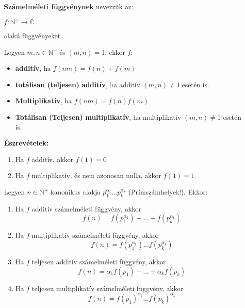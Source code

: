 \begin{frame}
  \begin{tcolorbox}[title={Def.: A számelméleti függvények}]
    \textbf{Számelméleti függvénynek} nevezzük az:\\
    \mtinyskip
    
    $f : \mathbb{N}^+ \rightarrow \mathbb{C}$\\
    \mtinyskip
    
    alakú függvényeket.\\
    \mmedskip

    Legyen $m, n \in \mathbb{N}^+$ és $(m, n) = 1$, ekkor $f$:
    \begin{itemize}
      \item \textbf{additív}, ha $f(nm) = f(n) + f(m)$
      \item \textbf{totálisan (teljesen) additív}, ha additív $(m, n) \neq 1$ esetén is.
      \item \textbf{Multiplikatív}, ha $f(nm) = f(n)f(m)$
      \item \textbf{Totálisan (Teljesen) multiplikatív}, ha multiplikatív $(m, n) \neq 1$ esetén is.
    \end{itemize}
  \tcblower
    \textbf{Észrevételek:}\\
    \begin{enumerate}
      \item Ha $f$ additív, akkor $f(1) = 0$
      \item Ha $f$ multiplikatív, és nem azonosan nulla, akkor $f(1) = 1$
    \end{enumerate}
  \end{tcolorbox}

  \begin{tcolorbox}[title={Tétel: Számelméleti függvények}]
    Legyen $n \in \mathbb{N}^+$ kanonikus alakja $p_1^{{\alpha}_1}...p_k^{{\alpha}_k}$ (Prímszámhelyek!). Ekkor:\\
    \begin{enumerate}
      \item Ha $f$ additív számelméleti függvény, akkor $$f(n) = f(p_1^{{\alpha}_1}) + ... + f(p_k^{{\alpha}_k})$$
      \item Ha $f$ multiplikatív számelméleti függvény, akkor $$f(n) = f(p_1^{{\alpha}_1})...f(p_k^{{\alpha}_k})$$
      \item Ha $f$ teljesen additív számelméleti függvény, akkor $$f(n) = {\alpha}_1f(p_1) + ... + {\alpha}_kf(p_k)$$
      \item Ha $f$ teljesen multiplikatív számelméleti függvény, akkor $$f(n) = f(p_1)^{{\alpha}_1}...f(p_k)^{{\alpha}_k}$$
    \end{enumerate}
  \end{tcolorbox}
\end{frame}


